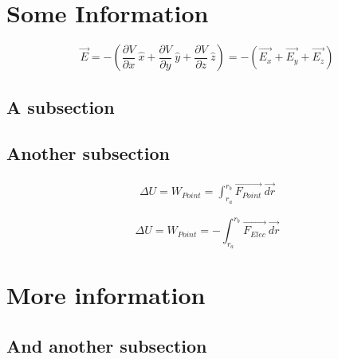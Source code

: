 
\section{Some Information}

\lipsum[0-1]

\begin{equation}
    \vec{E} = - \left( \frac{\partial V}{\partial x} \ \hat{x} + \frac{\partial V}{\partial y} \ \hat{y} + 
    \frac{\partial V}{\partial z} \ \hat{z} \right) = - (\vec{E_{x}} + \vec{E_{y}} + \vec{E_{z}})
\end{equation}

\lipsum[2-3]

\subsection{A subsection}

\lipsum[4-5]

\subsection{Another subsection}

\lipsum[6]

\begin{align*}
    \Delta U = W_{Point} = \int_{r_{a}}^{r_{b}} \vec{F_{Point}} \ \vec{dr}
\end{align*}    

\begin{equation}
    \Delta U = W_{Point} = - \int_{r_{a}}^{r_{b}} \vec{F_{Elec}} \ \vec{dr}
\end{equation} 

\lipsum[7]

\section{More information}

\lipsum[8-10]

\subsection{And another subsection}

\lipsum[10-12]
